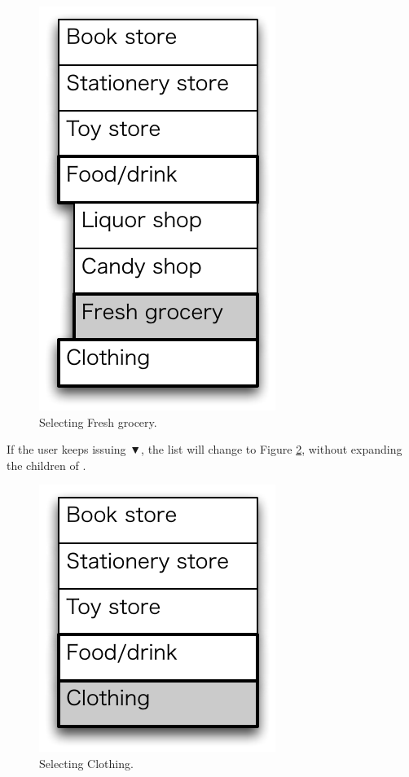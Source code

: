 \documentclass{article}
\def\down{▼}
\begin{document}
\begin{figure}[H]
\centerline{\includegraphics[width=\menuwidth,bb=0 0 139 238]{figures/fig6.pdf}}
\caption{Selecting Fresh grocery.}
\label{fig6}
\end{figure}

If the user keeps issuing {\down}, 
the list will change to Figure \ref{fig8},
without expanding the children of .

\begin{figure}[H]
\centerline{\includegraphics[width=\menuwidth,bb=0 0 139 157]{figures/fig8.pdf}}
\caption{Selecting Clothing.}
\label{fig8}
\end{figure}
\end{document}
